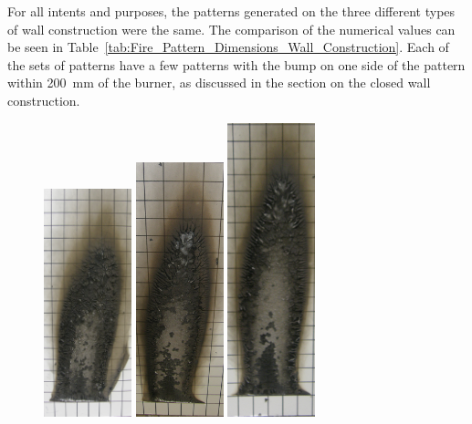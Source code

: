 \documentclass[twoside]{uocthesis}
\begin{document}
For all intents and purposes, the patterns generated on the three different types of wall construction were the same.  The comparison of the numerical values can be seen in Table~\ref{tab:Fire_Pattern_Dimensions_Wall_Construction}.  Each of the sets of 
patterns have a few patterns with the bump on one side of the pattern within 200~mm of the burner, as discussed in the section on the closed wall construction.     

\begin{figure}[p]
	\includegraphics[width=1.0in]{../Figures/GBNG1_P5120006}
	\includegraphics[width=1.0in]{../Figures/GBNG2_P5120024}
	\includegraphics[width=1.0in]{../Figures/GBNG3_P5120048}

\end{figure}
\end{document}
